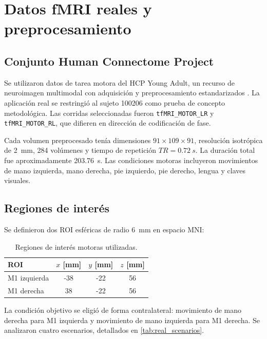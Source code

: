 \chapter{Datos fMRI reales y preprocesamiento}

\section{Conjunto Human Connectome Project}
Se utilizaron datos de tarea motora del HCP Young Adult, un recurso de neuroimagen multimodal con adquisición y preprocesamiento estandarizados \citep{VanEssen2013,Glasser2013,Barch2013}. La aplicación real se restringió al sujeto 100206 como prueba de concepto metodológica. Las corridas seleccionadas fueron \texttt{tfMRI\_MOTOR\_LR} y \texttt{tfMRI\_MOTOR\_RL}, que difieren en dirección de codificación de fase.

Cada volumen preprocesado tenía dimensiones $91\times109\times91$, resolución isotrópica de \SI{2}{mm}, 284 volúmenes y tiempo de repetición $TR=\SI{0.72}{s}$. La duración total fue aproximadamente \SI{203.76}{s}. Las condiciones motoras incluyeron movimientos de mano izquierda, mano derecha, pie izquierdo, pie derecho, lengua y claves visuales.

\section{Regiones de interés}
Se definieron dos ROI esféricas de radio \SI{6}{mm} en espacio MNI:
\begin{table}[H]
\centering
\caption{Regiones de interés motoras utilizadas.}
\label{tab:roi}
\begin{tabular}{lccc}
\toprule
\textbf{ROI} & $x$ [mm] & $y$ [mm] & $z$ [mm] \\
\midrule
M1 izquierda & -38 & -22 & 56 \\
M1 derecha & 38 & -22 & 56 \\
\bottomrule
\end{tabular}
\end{table}

La condición objetivo se eligió de forma contralateral: movimiento de mano derecha para M1 izquierda y movimiento de mano izquierda para M1 derecha. Se analizaron cuatro escenarios, detallados en \cref{tab:real_scenarios}.

